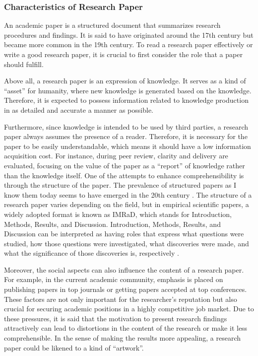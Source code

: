 \documentclass{book}
\begin{document}
\subsubsection{Characteristics of Research Paper}
An academic paper is a structured document that summarizes research procedures and findings. It is said to have originated around the 17th century but became more common in the 19th century. To read a research paper effectively or write a good research paper, it is crucial to first consider the role that a paper should fulfill. 

Above all, a research paper is an expression of knowledge. It serves as a kind of ``asset'' for humanity, where new knowledge is generated based on the knowledge. Therefore, it is expected to possess information related to knowledge production in as detailed and accurate a manner as possible.

Furthermore, since knowledge is intended to be used by third parties, a research paper always assumes the presence of a reader. Therefore, it is necessary for the paper to be easily understandable, which means it should have a low information acquisition cost. For instance, during peer review, clarity and delivery are evaluated, focusing on the value of the paper as a ``report'' of knowledge rather than the knowledge itself. One of the attempts to enhance comprehensibility is through the structure of the paper. The prevalence of structured papers as I know them today seems to have emerged in the 20th century \cite{harmon1989structure}. 
The structure of a research paper varies depending on the field, but in empirical scientific papers, a widely adopted format is known as IMRaD, which stands for Introduction, Methods, Results, and Discussion. Introduction, Methods, Results, and Discussion can be interpreted as having roles that express what questions were studied, how those questions were investigated, what discoveries were made, and what the significance of those discoveries is, respectively \cite{gastel2022write}.

Moreover, the social aspects can also influence the content of a research paper. For example, in the current academic community, emphasis is placed on publishing papers in top journals or getting papers accepted at top conferences. These factors are not only important for the researcher's reputation but also crucial for securing academic positions in a highly competitive job market. Due to these pressures, it is said that the motivation to present research findings attractively can lead to distortions in the content of the research or make it less comprehensible. In the sense of making the results more appealing, a research paper could be likened to a kind of ``artwork''.
\end{document}

